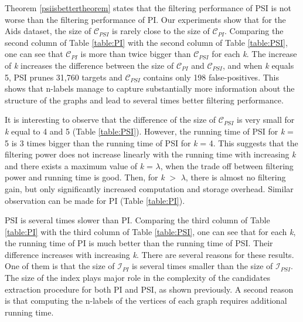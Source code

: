 \documentclass{l4proj}
\newcommand{\fancyI}{\mathcal{I}}
\newcommand{\fancyC}{\mathcal{C}}
\begin{document}
Theorem \ref{psiisbettertheorem} states that the filtering performance of PSI is not worse than the filtering performance of PI. Our experiments show that for the Aids dataset, the size of $\fancyC_{PSI}$ is rarely close to the size of $\fancyC_{PI}$. Comparing the second column of Table \ref{table:PI} with the second column of Table \ref{table:PSI}, one can see that $\fancyC_{PI}$ is more than twice bigger than $\fancyC_{PSI}$ for each \emph{k}. The increase of \emph{k} increases the difference between the size of $\fancyC_{PI}$ and $\fancyC_{PSI}$, and when \emph{k} equals 5, PSI prunes 31,760 targets and $\fancyC_{PSI}$ contains only 198 false-positives. This shows that n-labels manage to capture substantially more information about the structure of the graphs and lead to several times better filtering performance.

It is interesting to observe that the difference of the size of $\fancyC_{PSI}$ is very small for \emph{k} equal to 4 and 5 (Table \ref{table:PSI}). However, the running time of PSI for \emph{k} = 5 is 3 times bigger than the running time of PSI for \emph{k} = 4. This suggests that the filtering power does not increase linearly with the running time with increasing \emph{k} and there exists a maximum value of \emph{k} = $\lambda$, when the trade off between filtering power and running time is good. Then, for \emph{k} $>$ $\lambda$, there is almost no filtering gain, but only significantly increased computation and storage overhead. Similar observation can be made for PI (Table \ref{table:PI}).

PSI is several times slower than PI. Comparing the third column of Table \ref{table:PI} with the third column of Table \ref{table:PSI}, one can see that for each \emph{k}, the running time of PI is much better than the running time of PSI. Their difference increases with increasing \emph{k}. There are several reasons for these results. One of them is that the size of $\fancyI_{PI}$ is several times smaller than the size of $\fancyI_{PSI}$. The size of the index plays major role in the complexity of the candidates extraction procedure for both PI and PSI, as shown previously. A second reason is that computing the n-labels of the vertices of each graph requires additional running time.
\end{document}

